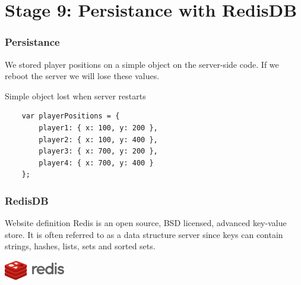 \section{Stage 9: Persistance with RedisDB}

\begin{frame}[fragile]
  \begin{center}
  \end{center}
\end{frame}

\begin{frame}[fragile]
  \frametitle{Persistance}

  We stored player positions on a simple object on the server-side code. If we reboot the server we will lose these values.

  \begin{block}{Simple object lost when server restarts}
    {\scriptsize
    \begin{verbatim}
    var playerPositions = {
        player1: { x: 100, y: 200 },
        player2: { x: 100, y: 400 },
        player3: { x: 700, y: 200 },
        player4: { x: 700, y: 400 }
    };
    \end{verbatim}
    }
  \end{block}
\end{frame}

\begin{frame}[fragile]
  \frametitle{RedisDB}
  \begin{block}{Website definition}
    Redis is an open source, BSD licensed, advanced key-value store. It is often referred to as a data structure server since keys can contain strings, hashes, lists, sets and sorted sets.
  \end{block}

  \begin{center}
    \includegraphics[width=100px]{images/redis-logo.jpg}
  \end{center}
\end{frame}

